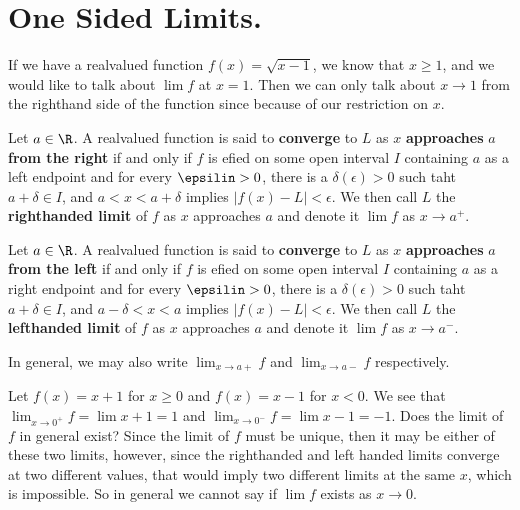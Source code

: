 
\section{One Sided Limits.}

If we have a realvalued function $f(x)=\sqrt{x-1}$, we know that  $x \geq 1$, and 
we would like to talk about  $\lim{f}$ at  $x=1$. Then we can only talk about  $x \rightarrow 1$ 
from the righthand side of the function since because of our restriction on $x$.

\begin{definition}
     Let $a \in \R$. A realvalued function is said to \textbf{converge}	to $L$ as 
     $x$ \textbf{approaches } $a$ \textbf{from the right} if and only if $f$ is 
     efied on some open interval $I$ containing $a$ as a left endpoint and for 
    every $\epsilin>0$, there is a $\delta(\epsilon)>0$ such taht $a+\delta \in I$, 
    and $a<x<a+\delta$ implies $|f(x)-L|<\epsilon$. We then call $L$ the 
    \textbf{righthanded limit} of  $f$ as  $x$ approaches  $a$ and denote it 
    $\lim{f}$ as  $x \rightarrow a^+$.
\end{definition}

\begin{definition}
     Let $a \in \R$. A realvalued function is said to \textbf{converge}	to $L$ as 
     $x$ \textbf{approaches } $a$ \textbf{from the left} if and only if $f$ is 
     efied on some open interval $I$ containing $a$ as a right endpoint and for 
    every $\epsilin>0$, there is a $\delta(\epsilon)>0$ such taht $a+\delta \in I$, 
    and $a-\delta<x<a$ implies $|f(x)-L|<\epsilon$. We then call $L$ the 
    \textbf{lefthanded limit} of  $f$ as  $x$ approaches  $a$ and denote it 
    $\lim{f}$ as  $x \rightarrow a^-$.
\end{definition}

In general, we may also write $\lim_{x \rightarrow a+}{f}$ and  $\lim_{x \rightarrow a-}{f}$ 
respectively.

\begin{example}
    Let $f(x)=x+1$ for  $x \geq 0$ and  $f(x)=x-1$ for $x<0$. We see that  
    $\lim_{x \rightarrow 0^+}{f}=\lim{x+1}=1$ and  $\lim_{x \rightarrow 0^-}{f}=
    \lim{x-1}=-1$. Does the limit of  $f$ in general exist? Since the limit of $f$	
    must be unique, then it may be either of these two limits, however, since the 
    righthanded and left handed limits converge at two different values, that would 
    imply two different limits at the same $x$, which is impossible. So in general 
    we cannot say if  $\lim{f}$ exists as  $x \rightarrow 0$.
\end{example} 

